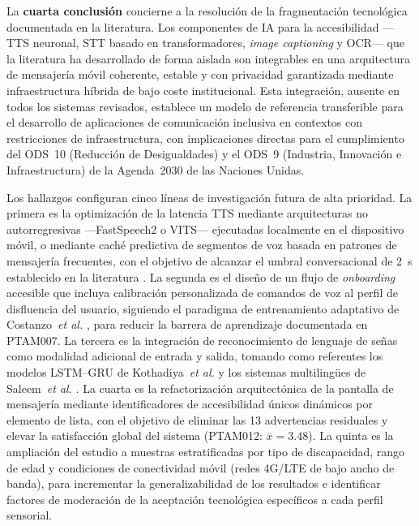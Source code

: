 \documentclass[journal]{IEEEtran}
\begin{document}
	La \textbf{cuarta conclusi\'on} concierne a la resoluci\'on de la fragmentaci\'on tecnol\'ogica documentada en la literatura. Los componentes de IA para la accesibilidad ---TTS neuronal, STT basado en transformadores, \textit{image captioning} y OCR--- que la literatura ha desarrollado de forma aislada \cite{tan2021, baevski2020, radford2023, ming2022, mukherjee2023} son integrables en una arquitectura de mensajer\'ia m\'ovil coherente, estable y con privacidad garantizada mediante infraestructura h\'ibrida de bajo coste institucional. Esta integraci\'on, ausente en todos los sistemas revisados, establece un modelo de referencia transferible para el desarrollo de aplicaciones de comunicaci\'on inclusiva en contextos con restricciones de infraestructura, con implicaciones directas para el cumplimiento del ODS~10 (Reducci\'on de Desigualdades) y el ODS~9 (Industria, Innovaci\'on e Infraestructura) de la Agenda~2030 de las Naciones Unidas.
	
	Los hallazgos configuran cinco l\'ineas de investigaci\'on futura de alta prioridad. La primera es la optimizaci\'on de la latencia TTS mediante arquitecturas no autorregresivas ---FastSpeech2 o VITS--- ejecutadas localmente en el dispositivo m\'ovil, o mediante cach\'e predictiva de segmentos de voz basada en patrones de mensajer\'ia frecuentes, con el objetivo de alcanzar el umbral conversacional de 2~s establecido en la literatura \cite{tan2021}. La segunda es el dise\~no de un flujo de \textit{onboarding} accesible que incluya calibraci\'on personalizada de comandos de voz al perfil de disfluencia del usuario, siguiendo el paradigma de entrenamiento adaptativo de Costanzo~\textit{et al.} \cite{costanzo2023}, para reducir la barrera de aprendizaje documentada en PTAM007. La tercera es la integraci\'on de reconocimiento de lenguaje de se\~nas como modalidad adicional de entrada y salida, tomando como referentes los modelos LSTM--GRU de Kothadiya~\textit{et al.} \cite{kothadiya2022} y los sistemas multiling\"ues de Saleem~\textit{et al.} \cite{saleem2023}. La cuarta es la refactorizaci\'on arquitect\'onica de la pantalla de mensajer\'ia mediante identificadores de accesibilidad \'unicos din\'amicos por elemento de lista, con el objetivo de eliminar las 13 advertencias residuales y elevar la satisfacci\'on global del sistema (PTAM012: $\bar{x}=3.48$). La quinta es la ampliaci\'on del estudio a muestras estratificadas por tipo de discapacidad, rango de edad y condiciones de conectividad m\'ovil (redes 4G/LTE de bajo ancho de banda), para incrementar la generalizabilidad de los resultados e identificar factores de moderaci\'on de la aceptaci\'on tecnol\'ogica espec\'ificos a cada perfil sensorial.
	
\end{document}

